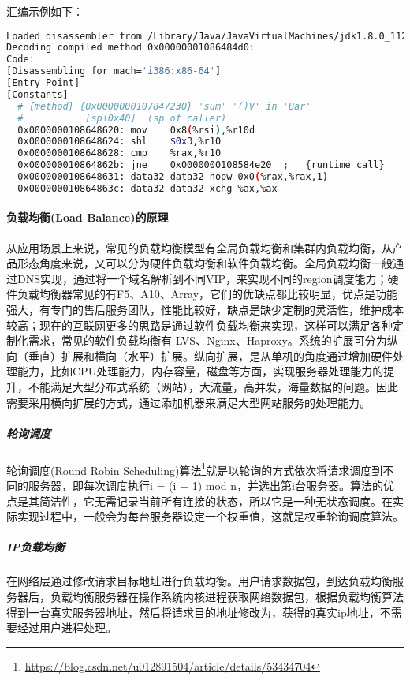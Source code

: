 \documentclass[../../../interview-questions.tex]{subfiles}
\begin{document}
汇编示例如下：
 
\begin{lstlisting}[language=Bash]
Loaded disassembler from /Library/Java/JavaVirtualMachines/jdk1.8.0_112.jdk/Contents/Home/jre/lib/hsdis-amd64.dylib
Decoding compiled method 0x00000001086484d0:
Code:
[Disassembling for mach='i386:x86-64']
[Entry Point]
[Constants]
  # {method} {0x0000000107847230} 'sum' '()V' in 'Bar'
  #           [sp+0x40]  (sp of caller)
  0x0000000108648620: mov    0x8(%rsi),%r10d
  0x0000000108648624: shl    $0x3,%r10
  0x0000000108648628: cmp    %rax,%r10
  0x000000010864862b: jne    0x0000000108584e20  ;   {runtime_call}
  0x0000000108648631: data32 data32 nopw 0x0(%rax,%rax,1)
  0x000000010864863c: data32 data32 xchg %ax,%ax
\end{lstlisting}

\paragraph{负载均衡(Load Balance)的原理}

从应用场景上来说，常见的负载均衡模型有全局负载均衡和集群内负载均衡，从产品形态角度来说，又可以分为硬件负载均衡和软件负载均衡。全局负载均衡一般通过DNS实现，通过将一个域名解析到不同VIP，来实现不同的region调度能力；硬件负载均衡器常见的有F5、A10、Array，它们的优缺点都比较明显，优点是功能强大，有专门的售后服务团队，性能比较好，缺点是缺少定制的灵活性，维护成本较高；现在的互联网更多的思路是通过软件负载均衡来实现，这样可以满足各种定制化需求，常见的软件负载均衡有 LVS、Nginx、Haproxy。系统的扩展可分为纵向（垂直）扩展和横向（水平）扩展。纵向扩展，是从单机的角度通过增加硬件处理能力，比如CPU处理能力，内存容量，磁盘等方面，实现服务器处理能力的提升，不能满足大型分布式系统（网站），大流量，高并发，海量数据的问题。因此需要采用横向扩展的方式，通过添加机器来满足大型网站服务的处理能力。

\subparagraph{轮询调度}

轮询调度(Round Robin Scheduling)算法\footnote{\url{https://blog.csdn.net/u012891504/article/details/53434704}}就是以轮询的方式依次将请求调度到不同的服务器，即每次调度执行i = (i + 1) mod n，并选出第i台服务器。算法的优点是其简洁性，它无需记录当前所有连接的状态，所以它是一种无状态调度。在实际实现过程中，一般会为每台服务器设定一个权重值，这就是权重轮询调度算法。

\subparagraph{IP负载均衡}

在网络层通过修改请求目标地址进行负载均衡。用户请求数据包，到达负载均衡服务器后，负载均衡服务器在操作系统内核进程获取网络数据包，根据负载均衡算法得到一台真实服务器地址，然后将请求目的地址修改为，获得的真实ip地址，不需要经过用户进程处理。
\end{document}

